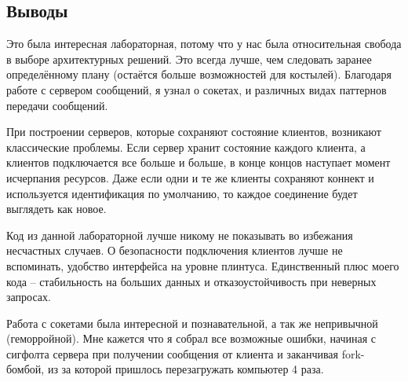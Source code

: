 \documentclass[12pt]{article}
\begin{document}
\subsection*{Выводы}

Это была интересная лабораторная, потому что у нас была относительная свобода в выборе архитектурных решений. Это всегда лучше, чем следовать заранее определённому плану (остаётся больше возможностей для костылей). Благодаря работе с сервером сообщений, я узнал о сокетах, и различных видах паттернов передачи сообщений.

При построении серверов, которые сохраняют состояние клиентов, возникают классические проблемы. Если сервер хранит состояние каждого клиента, а клиентов
подключается все больше и больше, в конце концов наступает момент исчерпания
ресурсов. Даже если одни и те же клиенты сохраняют коннект и используется идентификация по умолчанию, то каждое соединение будет выглядеть как новое.

Код из данной лабораторной лучше никому не показывать во избежания несчастных случаев. О безопасности подключения клиентов лучше не вспоминать, удобство интерфейса на уровне плинтуса. Единственный плюс моего кода -- стабильность на больших данных и отказоустойчивость при неверных запросах.

Работа с сокетами была интересной и познавательной, а так же непривычной (геморройной). Мне кажется что я собрал все возможные ошибки, начиная с сигфолта сервера при получении сообщения от клиента и заканчивая fork-бомбой, из за которой пришлось перезагружать компьютер 4 раза.
\end{document}
